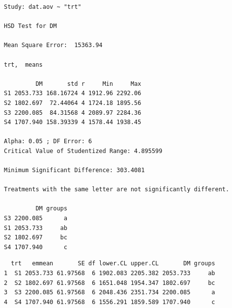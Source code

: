\documentclass[a4paper, 10pt, fleqn, twosided]{memoir}
\begin{document}
\begin{tcolorbox}[title = Example 4 Tukey's multiple comparison output]
\begin{verbatim}
Study: dat.aov ~ "trt"

HSD Test for DM

Mean Square Error:  15363.94

trt,  means

         DM       std r     Min     Max
S1 2053.733 168.16724 4 1912.96 2292.06
S2 1802.697  72.44064 4 1724.18 1895.56
S3 2200.085  84.31568 4 2089.97 2284.36
S4 1707.940 158.39339 4 1578.44 1938.45

Alpha: 0.05 ; DF Error: 6
Critical Value of Studentized Range: 4.895599

Minimum Significant Difference: 303.4081

Treatments with the same letter are not significantly different.

         DM groups
S3 2200.085      a
S1 2053.733     ab
S2 1802.697     bc
S4 1707.940      c
\end{verbatim}
\tcblower
\begin{verbatim}
  trt   emmean       SE df lower.CL upper.CL       DM groups
1  S1 2053.733 61.97568  6 1902.083 2205.382 2053.733     ab
2  S2 1802.697 61.97568  6 1651.048 1954.347 1802.697     bc
3  S3 2200.085 61.97568  6 2048.436 2351.734 2200.085      a
4  S4 1707.940 61.97568  6 1556.291 1859.589 1707.940      c
\end{verbatim}
\end{tcolorbox}
\end{document}
